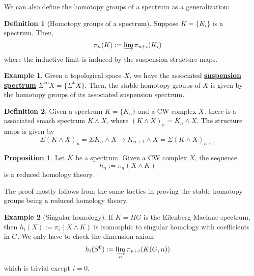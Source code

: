 \documentclass{article}
\theoremstyle{definition}
\theoremstyle{definition}
\newtheorem{definition}{Definition}[theorem]
\theoremstyle{definition}
\theoremstyle{definition}
\newtheorem{proposition}{Proposition}[theorem]
\theoremstyle{definition}
\theoremstyle{definition}
\theoremstyle{definition}
\newtheorem{example}{Example}[theorem]
\begin{document}
We can also define the homotopy groups of a spectrum as a generalization:

\begin{tcolorbox}[colback=purple!5!white,colframe=purple!75!black]
\begin{definition}[Homotopy groups of a spectrum]
Suppose $K=\{K_i\}$ is a spectrum. Then, 
\[\pi_n(K):=\varinjlim \pi_{n+i}(K_i)\]
where the inductive limit is induced by the suspension structure maps. 
\end{definition}
\end{tcolorbox}

\begin{tcolorbox}[colback=yellow!5!white,colframe=yellow!30!white]
\begin{example}
Given a topological space $X$, we have the associated \underline{\textbf{suspension spectrum}} $\Sigma^{\infty}X=\{\Sigma^kX\}$. Then, the stable homotopy groups of $X$ is given by the homotopy groups of its associated suspension spectrum. 
\end{example}
\end{tcolorbox}

\begin{tcolorbox}[colback=purple!5!white,colframe=purple!75!black]
\begin{definition}
Given a spectrum $K=\{K_n\}$ and a CW complex $X$, there is a associated smash spectrum $K\wedge X$, where $(K\wedge X)_n=K_n\wedge X$. The structure maps is given by 
\[\Sigma (K\wedge X)_n =\Sigma K_n\wedge X\to K_{n+1}\wedge X=\Sigma (K\wedge X)_{n+1}\]
\end{definition}
\end{tcolorbox}

\begin{tcolorbox}[colback=blue!5!white,colframe=blue!30!white]
\begin{proposition}
Let $K$ be a spectrum. Given a CW complex $X$, the sequence
\[h_n:=\pi_n(X\wedge K)\]
is a reduced homology theory.
\end{proposition}
\end{tcolorbox}
The proof mostly follows from the same tactics in proving the stable homotopy groups being a reduced homology theory.
\begin{tcolorbox}[colback=yellow!5!white,colframe=yellow!30!white]
\begin{example}[Singular homology]
If $K=HG$ is the Eilenberg-Maclane spectrum, then $h_i(X):=\pi_i(X\wedge K)$ is isomorphic to singular homology with coefficients in $G$. We only have to check the dimension axiom 
\[h_i(S^0):=\varinjlim_n \pi_{n+i}(K(G,n))\]
which is trivial except $i=0$. 
\end{example}
\end{tcolorbox}
\end{document}
